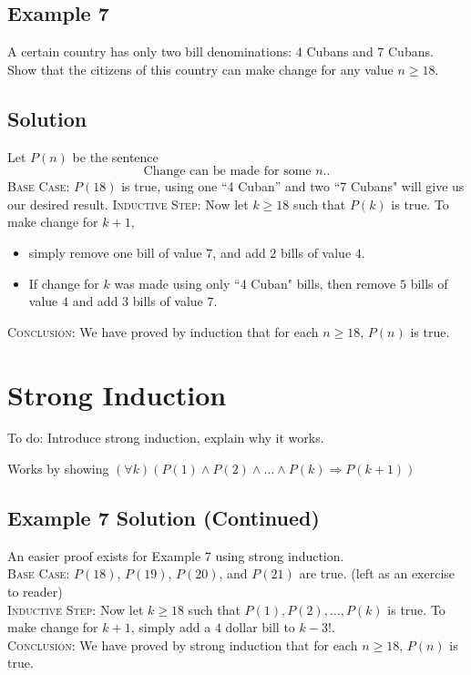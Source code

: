 \documentclass{article}
\begin{document}
\subsection*{Example 7}
    A certain country has only two bill denominations: $4$ Cubans and $7$ Cubans. Show that the citizens of this country can make change for any value $n \ge 18$.

\subsection*{Solution}
    Let $P(n)$ be the sentence $$\text{Change can be made for some $n$.}.$$
    \textsc{Base Case}: $P(18)$ is true, using one ``4 Cuban'' and two ``7 Cubans" will give us our desired result.
    \textsc{Inductive Step}: Now let $k \ge 18$ such that $P(k)$ is true. To make change for $k + 1$,
    \begin{itemize}
        \item simply remove one bill of value $7$, and add $2$ bills of value $4$.
        \item If change for $k$ was made using only ``4 Cuban" bills, then remove $5$ bills of value $4$ and add $3$ bills of value $7$.
    \end{itemize}
    \textsc{Conclusion}: We have proved by induction that for each $n \ge 18$, $P(n)$ is true.

\section*{Strong Induction}
    To do: Introduce strong induction, explain why it works.
    
    Works by showing $(\forall k)(P(1) \land P(2) \land \dots \land P(k) \Rightarrow P(k + 1))$

\subsection*{Example 7 Solution (Continued)}
    An easier proof exists for Example 7 using strong induction. \\
    \textsc{Base Case}: $P(18)$, $P(19)$, $P(20)$, and $P(21)$ are true. (left as an exercise to reader) \\
    \textsc{Inductive Step}: Now let $k \ge 18$ such that $P(1), P(2), \dots, P(k)$ is true. To make change for $k + 1$, simply add a $4$ dollar bill to $k - 3$!. \\
    \textsc{Conclusion}: We have proved by strong induction that for each $n \ge 18$, $P(n)$ is true.
    
\end{document}
